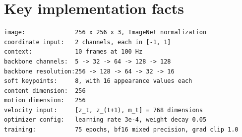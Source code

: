 \documentclass[11pt,a4paper]{article}
\begin{document}
\section{Key implementation facts}
\begin{verbatim}
image:              256 x 256 x 3, ImageNet normalization
coordinate input:   2 channels, each in [-1, 1]
context:            10 frames at 100 Hz
backbone channels:  5 -> 32 -> 64 -> 128 -> 128
backbone resolution:256 -> 128 -> 64 -> 32 -> 16
soft keypoints:     8, with 16 appearance values each
content dimension:  256
motion dimension:   256
velocity input:     [z_t, z_(t+1), m_t] = 768 dimensions
optimizer config:   learning rate 3e-4, weight decay 0.05
training:           75 epochs, bf16 mixed precision, grad clip 1.0
\end{verbatim}



\end{document}
